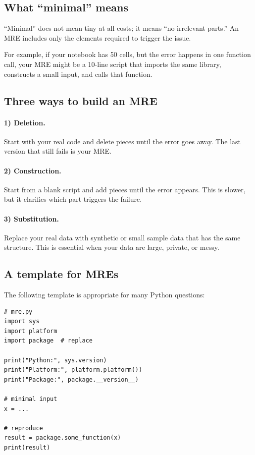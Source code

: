 \subsection{What ``minimal'' means}
``Minimal'' does not mean tiny at all costs; it means ``no irrelevant parts.'' An MRE includes only the elements required to trigger the issue.

For example, if your notebook has 50 cells, but the error happens in one function call, your MRE might be a 10-line script that imports the same library, constructs a small input, and calls that function.

\subsection{Three ways to build an MRE}
\paragraph{1) Deletion.} Start with your real code and delete pieces until the error goes away. The last version that still fails is your MRE.

\paragraph{2) Construction.} Start from a blank script and add pieces until the error appears. This is slower, but it clarifies which part triggers the failure.

\paragraph{3) Substitution.} Replace your real data with synthetic or small sample data that has the same structure. This is essential when your data are large, private, or messy.

\subsection{A template for MREs}
The following template is appropriate for many Python questions:

\begin{verbatim}
# mre.py
import sys
import platform
import package  # replace

print("Python:", sys.version)
print("Platform:", platform.platform())
print("Package:", package.__version__)

# minimal input
x = ...

# reproduce
result = package.some_function(x)
print(result)
\end{verbatim}

